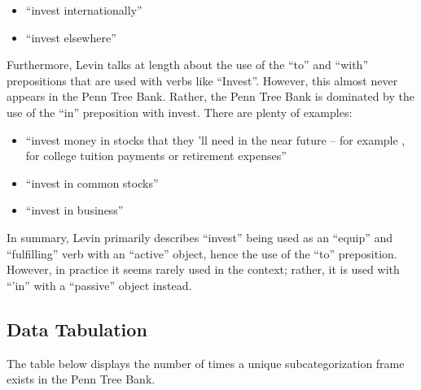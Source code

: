 \documentclass[10pt]{article}
\begin{document}
\begin{itemize}
\item ``invest internationally''
\item ``invest elsewhere''
\end{itemize}

Furthermore, Levin talks at length about the use of the ``to'' and ``with'' prepositions that are used with verbs like ``Invest''. However, this almost never appears in the Penn Tree Bank. Rather, the Penn Tree Bank is dominated by the use of the ``in'' preposition with invest. There are plenty of examples:

\begin{itemize}
\item ``invest money in stocks that they 'll need in the near future -- for example , for college tuition payments or retirement expenses''
\item ``invest in common stocks''
\item ``invest in business''
\end{itemize}

In summary, Levin primarily describes ``invest'' being used as an ``equip'' and ``fulfilling'' verb with an ``active'' object, hence the use of the ``to'' preposition. However,  in practice it seems rarely used in the context; rather, it is used with ``'in'' with a ``passive'' object instead.

\subsection*{Data Tabulation}

The table below displays the number of times a unique subcategorization frame exists in the Penn Tree Bank. 
\end{document}
